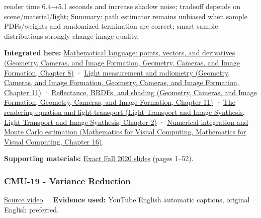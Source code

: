 render time 6.4→5.1 seconds and increase shadow noise; tradeoff depends on scene/material/light; Summary: path estimator remains unbiased when sample PDFs/weights and randomized termination are correct; smart sample distributions strongly change image quality.

\textbf{Integrated here:} \href{../03-Geometry-Cameras-and-Image-Formation/main.pdf\#nameddest=03-visual-computing-i-ch001-mathematical-language-points-vectors-and-derivatives}{Mathematical language: points, vectors, and derivatives (Geometry, Cameras, and Image Formation, Geometry, Cameras, and Image Formation, Chapter 8)} · \href{../03-Geometry-Cameras-and-Image-Formation/main.pdf\#nameddest=03-visual-computing-i-ch004-light-measurement-and-radiometry}{Light measurement and radiometry (Geometry, Cameras, and Image Formation, Geometry, Cameras, and Image Formation, Chapter 11)} · \href{../03-Geometry-Cameras-and-Image-Formation/main.pdf\#nameddest=03-visual-computing-i-ch004-reflectance-brdfs-and-shading}{Reflectance, BRDFs, and shading (Geometry, Cameras, and Image Formation, Geometry, Cameras, and Image Formation, Chapter 11)} · \href{../04-Light-Transport-and-Image-Synthesis/main.pdf\#nameddest=03-visual-computing-i-ch007-the-rendering-equation-and-light-transport}{The rendering equation and light transport (Light Transport and Image Synthesis, Light Transport and Image Synthesis, Chapter 2)} · \href{../02-Mathematics-for-Visual-Computing/main.pdf\#nameddest=03-visual-computing-i-ch012-numerical-integration-and-monte-carlo-estimation}{Numerical integration and Monte Carlo estimation (Mathematics for Visual Computing, Mathematics for Visual Computing, Chapter 16)}.

\textbf{Supporting materials:} \href{https://15462.courses.cs.cmu.edu/fall2020content/lectures/18_montecarloraytracing/18_montecarloraytracing_slides.pdf}{Exact Fall 2020 slides} (pages 1--52).

\subsubsection{CMU-19 - Variance Reduction}\label{04-visual-computing-ii-ch036-cmu-19---variance-reduction}

\href{https://www.youtube.com/watch?v=IQhLk_XaFc8}{Source video} · \textbf{Evidence used:} YouTube English automatic captions, original English preferred.

